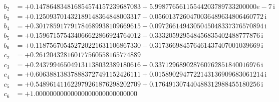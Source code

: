 {\begin{align*}
b_{2} &= +0.147864834816854574157239687083 + 5.99877656115544203789733200000e-7\,\mathrm{i}\\
b_{3} &= +0.125093701432189148364848003317 - 0.0560137260470036489634806460772\,\mathrm{i}\\
b_{4} &= +0.301785917791784689938109669615 - 0.0972661494305045048337376570894\,\mathrm{i}\\
b_{5} &= +0.159671575434066622866924764012 - 0.333205929548456835402488777876\,\mathrm{i}\\
b_{6} &= +0.118756705452720221631106867330 - 0.317366984576461437407001039669\,\mathrm{i}\\[1mm]
c_{2} &= +0.261204328160177560558165774889\\
c_{3} &= +0.243799465049131138032389180616 - 0.337129689028760762851840016976\,\mathrm{i}\\
c_{4} &= +0.606388138378883727491152426111 + 0.0158902947722143136909683061214\,\mathrm{i}\\
c_{5} &= +0.548961411622979261876298202709 + 0.176491307440488312988455180256\,\mathrm{i}\\
c_{6} &= +1.00000000000000000000000000000
\end{align*}
}

